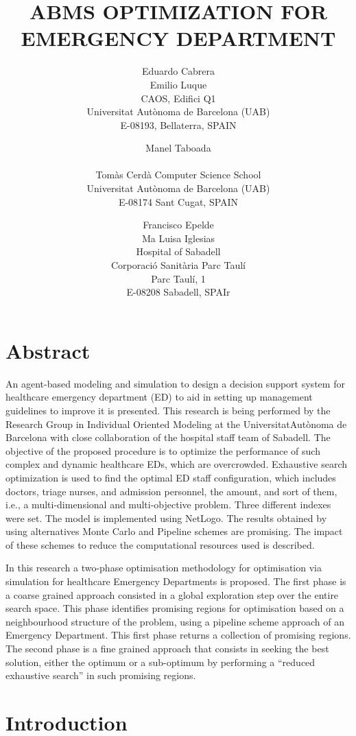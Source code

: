 \documentclass[11pt]{article} %
\title{ABMS OPTIMIZATION FOR EMERGENCY DEPARTMENT}
\author{Eduardo Cabrera\\
Emilio Luque\\ [12pt]
CAOS, Edifici Q1\\
Universitat Aut\`onoma de Barcelona (UAB)\\
E-08193, Bellaterra, SPAIN
\and
Manel Taboada \\\\[12pt]
Tom\`as Cerd\`a Computer Science School\\
Universitat Aut\`onoma de Barcelona (UAB)\\
E-08174 Sant Cugat, SPAIN
\and
Francisco Epelde \\
        Ma Luisa Iglesias \\[12pt]
        Hospital of Sabadell\\
Corporaci\'o Sanit\`aria Parc Taul\'i \\
Parc Taul\'i, 1 \\
E-08208 Sabadell, SPAIr}
\begin{document}
\maketitle

\section*{Abstract}
An agent-based modeling and simulation to design a decision support system for healthcare emergency department (ED) to aid in setting up management guidelines to improve it is presented. This research is being performed by the Research Group in Individual Oriented Modeling at the UniversitatAut\`onoma de Barcelona with close collaboration of the hospital staff team of Sabadell. The objective of the proposed  procedure is to optimize the performance of such 
complex and dynamic healthcare EDs, which are overcrowded. Exhaustive search optimization is used to find the optimal ED staff configuration, which includes doctors, triage nurses, and admission personnel, the amount, and sort of them, i.e., a multi-dimensional and multi-objective problem. Three different indexes were set. The model is implemented using NetLogo. The results obtained by using alternatives Monte Carlo and Pipeline schemes are promising. The impact of these schemes to reduce the computational resources used  is described.

In this research a two-phase optimisation methodology for optimisation via simulation for healthcare Emergency Departments is proposed. The first phase is a coarse grained approach consisted in a global exploration step over the entire search space. This phase identifies promising regions for optimisation based on a neighbourhood structure of the problem, using a pipeline scheme approach of an Emergency Department. This first phase returns a collection of promising regions. The second phase is a fine grained approach that consists in seeking the best solution, either the optimum or a sub-optimum by performing a “reduced exhaustive search” in such promising regions. 


\section{Introduction}
\label{sec:intro}
\end{document}
